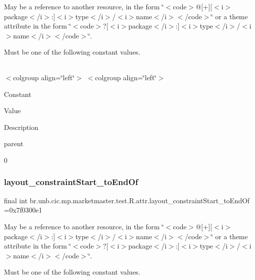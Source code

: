May be a reference to another resource, in the form \char`\"{}$<$code$>$@\mbox{[}+\mbox{]}\mbox{[}$<$i$>$package$<$/i$>$\+:\mbox{]}$<$i$>$type$<$/i$>$/$<$i$>$name$<$/i$>$$<$/code$>$\char`\"{} or a theme attribute in the form \char`\"{}$<$code$>$?\mbox{[}$<$i$>$package$<$/i$>$\+:\mbox{]}$<$i$>$type$<$/i$>$/$<$i$>$name$<$/i$>$$<$/code$>$\char`\"{}. 

Must be one of the following constant values.

\tabulinesep=1mm
\begin{longtabu} spread 0pt [c]{*{0}{|X[-1]}|}
\hline
\end{longtabu}
$<$colgroup align=\char`\"{}left\char`\"{}$>$ $<$colgroup align=\char`\"{}left\char`\"{}$>$ 

Constant

Value

Description 

parent

0\mbox{\label{classbr_1_1unb_1_1cic_1_1mp_1_1marketmaster_1_1test_1_1R_1_1attr_a183a89783edd7261216f596258846c6a}} 
\subsubsection{\texorpdfstring{layout\+\_\+constraint\+Start\+\_\+to\+End\+Of}{layout\_constraintStart\_toEndOf}}
{\footnotesize\ttfamily final int br.\+unb.\+cic.\+mp.\+marketmaster.\+test.\+R.\+attr.\+layout\+\_\+constraint\+Start\+\_\+to\+End\+Of =0x7f0300e1\hspace{0.3cm}{\ttfamily [static]}}

May be a reference to another resource, in the form \char`\"{}$<$code$>$@\mbox{[}+\mbox{]}\mbox{[}$<$i$>$package$<$/i$>$\+:\mbox{]}$<$i$>$type$<$/i$>$/$<$i$>$name$<$/i$>$$<$/code$>$\char`\"{} or a theme attribute in the form \char`\"{}$<$code$>$?\mbox{[}$<$i$>$package$<$/i$>$\+:\mbox{]}$<$i$>$type$<$/i$>$/$<$i$>$name$<$/i$>$$<$/code$>$\char`\"{}. 

Must be one of the following constant values.

